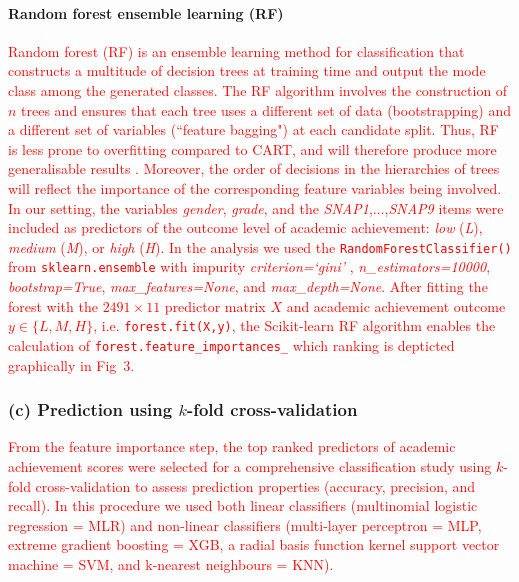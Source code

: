 \documentclass[10pt,letterpaper]{article}
\begin{document}
{{\paragraph{Random forest ensemble learning (RF)}
\textcolor{red}{Random forest (RF) is an ensemble learning method for classification that constructs a multitude of decision trees at training time and output the mode class among 
the generated classes. The RF algorithm involves the construction of $n$ trees and ensures that each tree uses a different set of data (bootstrapping) 
and a different set of variables (``feature bagging") at each candidate split. 
Thus, RF is less prone to overfitting compared to CART, and will therefore produce more generalisable results \cite{Breiman2001}.  
Moreover, the order of decisions in the hierarchies of trees will reflect the importance of the corresponding feature variables being involved. In our setting,
the variables {\it gender}, {\it grade}, and the {\it SNAP1},$\ldots$,{\it SNAP9} items were included as predictors of the outcome level of academic achievement:
{\it low} ({\it L}), {\it medium} ({\it M}), or {\it high} ({\it H}).
In the analysis we used the {\tt \small RandomForestClassifier()}  from {\tt \small sklearn.ensemble} with impurity {\it criterion=`gini'} ,
{\it n\_estimators=10000}, {\it bootstrap=True}, {\it max\_features=None}, and {\it max\_depth=None}. 
After fitting the forest with the $2491 \times 11$ predictor matrix $X$ and academic achievement outcome $y \in \{L, M, H\} $, i.e. {\tt \small forest.fit(X,y)}, the 
Scikit-learn RF algorithm enables the calculation of {\tt \small forest.feature\_importances\_} which ranking is depticted graphically in Fig~3.}



\subsubsection*{(c) Prediction using $k$-fold cross-validation}

\textcolor{red}{From the feature importance step, the top ranked predictors of academic achievement scores were 
selected for a comprehensive classification study using $k$-fold cross-validation to assess prediction properties (accuracy, precision, and recall). 
In this procedure we used both linear classifiers (multinomial logistic regression = MLR) and non-linear classifiers 
(multi-layer perceptron = MLP,  extreme gradient boosting = XGB, a radial basis function kernel support vector machine = SVM, and k-nearest neighbours  =
KNN). }

}}
\end{document}
